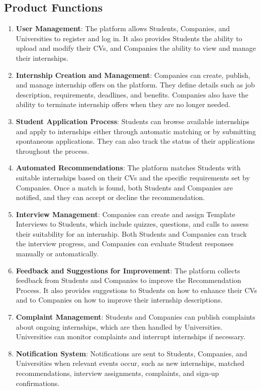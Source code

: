 \subsection{Product Functions}
\begin{enumerate}
    \item \textbf{User Management}: The platform allows Students, Companies, and Universities to register and log in. It also provides Students the ability to upload and modify their CVs, and Companies the ability to view and manage their internships.
    \item \textbf{Internship Creation and Management}: Companies can create, publish, and manage internship offers on the platform. They define details such as job description, requirements, deadlines, and benefits. Companies also have the ability to terminate internship offers when they are no longer needed.
    \item \textbf{Student Application Process}: Students can browse available internships and apply to internships either through automatic matching or by submitting spontaneous applications. They can also track the status of their applications throughout the process.
    \item \textbf{Automated Recommendations}: The platform matches Students with suitable internships based on their CVs and the specific requirements set by Companies. Once a match is found, both Students and Companies are notified, and they can accept or decline the recommendation.
    \item \textbf{Interview Management}: Companies can create and assign Template Interviews to Students, which include quizzes, questions, and calls to assess their suitability for an internship. Both Students and Companies can track the interview progress, and Companies can evaluate Student responses manually or automatically.
    \item \textbf{Feedback and Suggestions for Improvement}: The platform collects feedback from Students and Companies to improve the Recommendation Process. It also provides suggestions to Students on how to enhance their CVs and to Companies on how to improve their internship descriptions.
    \item \textbf{Complaint Management}: Students and Companies can publish complaints about ongoing internships, which are then handled by Universities. Universities can monitor complaints and interrupt internships if necessary.
    \item \textbf{Notification System}: Notifications are sent to Students, Companies, and Universities when relevant events occur, such as new internships, matched recommendations, interview assignments, complaints, and sign-up confirmations.
\end{enumerate}

